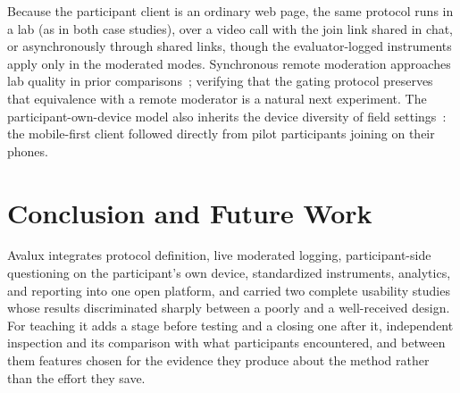 \documentclass[conference]{IEEEtran}
\begin{document}
Because the participant client is an ordinary web page, the same
protocol runs in a lab (as in both case studies), over a video call
with the join link shared in chat, or asynchronously through shared
links, though the evaluator-logged instruments apply only in the
moderated modes. Synchronous remote moderation approaches lab
quality in prior comparisons~\cite{andreasen2007remote,
brush2004comparison}; verifying that the gating protocol preserves that
equivalence with a remote moderator is a natural next experiment. The
participant-own-device model also inherits the device diversity of
field settings~\cite{kaikkonen2005usability}: the mobile-first client
followed directly from pilot participants joining on their phones.

\section{Conclusion and Future Work}
\label{sec:future}
Avalux integrates protocol definition, live moderated logging,
participant-side questioning on the participant's own device, standardized
instruments, analytics, and reporting into one open platform, and carried
two complete usability studies whose results discriminated sharply between
a poorly and a well-received design. For teaching it adds a stage before
testing and a closing one after it, independent inspection and its
comparison with what participants encountered, and between them features
chosen for the evidence they produce about the method rather than the
effort they save.
\end{document}
